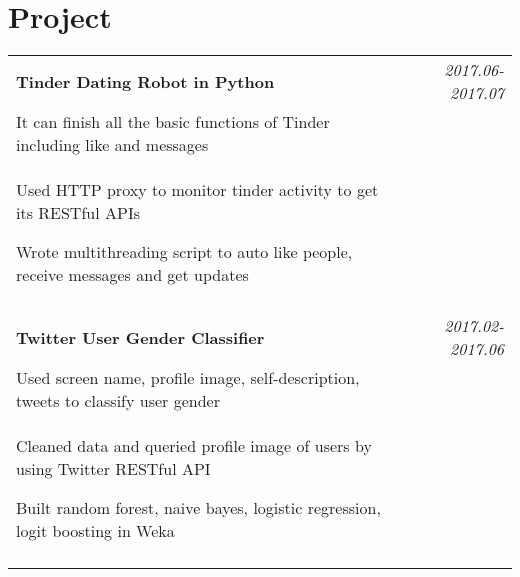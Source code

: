 \documentclass[a4paper,10pt]{article}
\begin{document}
\section{Project}
\begin{tabular}{p{13.5cm}p{0.5cm}r}

\textbf{Tinder Dating Robot in Python} && \emph{2017.06-2017.07} \\
\hspace{1em} It can finish all the basic functions of Tinder including like and  messages&&\vspace{-0.5em} \\
\begin{compactitem}
  \item Used HTTP proxy to monitor tinder activity to get its RESTful APIs
  \item Wrote multithreading script to auto like people, receive messages and get updates
\end{compactitem}&&\vspace{-2.2em} \\
\multicolumn{3}{c}{} \\


\textbf{Twitter User Gender Classifier} && \emph{2017.02-2017.06} \\
\hspace{1em} Used screen name, profile image, self-description, tweets to classify user gender&&\vspace{-0.5em} \\
\begin{compactitem}
  \item Cleaned data and queried profile image of users by using Twitter RESTful API
  \item Built random forest, naive bayes, logistic regression, logit boosting in Weka
\end{compactitem}&&\vspace{-2.2em} \\
\multicolumn{3}{c}{} \\



\end{tabular}
\end{document}
